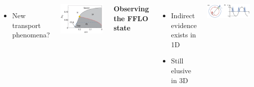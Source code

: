 \documentclass[26pt, paperwidth=36in,paperheight=48in]{tikzposter} %
\newcommand{\myfont}{\fontsize{26}{40}\selectfont}
\begin{document}
\begin{columns}
{\begin{minipage}{0.3\textwidth}
\begin{itemize}
			\item New transport phenomena?
		\end{itemize}		
	\end{minipage}
	\hspace{-4.0cm}
	\vspace{-1.0cm}
	\begin{minipage}{0.15\textwidth}
		\includegraphics[width=\textwidth]{figures_retreat/FFLO_phase_diagram.png}
	\end{minipage}	
	
	
	\vspace{2.0cm}
	\begin{minipage}{0.25\textwidth}
		\flushleft
		\vspace{0.5cm}
		\textbf{Observing the FFLO state}
		\vspace{0.5cm}
		\myfont
		\begin{minipage}{0.75\textwidth}
			\flushleft
			\vspace{1.0cm}
			\begin{itemize}				
				\item Indirect evidence exists in 1D 
				\item Still elusive in 3D
			\end{itemize}
		\end{minipage}
	\end{minipage}
	\hspace{-8.2cm}
	\begin{minipage}{0.2\textwidth}
		\includegraphics[width=1.3\textwidth]{figures_retreat/FFLO.png}
	\end{minipage}	
	\vspace{1.0cm}
	}
	\note[targetoffsetx=5cm, targetoffsety=-6.8cm, angle=0, radius=0cm,
	width=0.1cm, rotate=0, connection, linewidth=0cm,
	roundedcorners=0, innersep=0cm]{[6]}
	

\end{columns}
\end{document}
